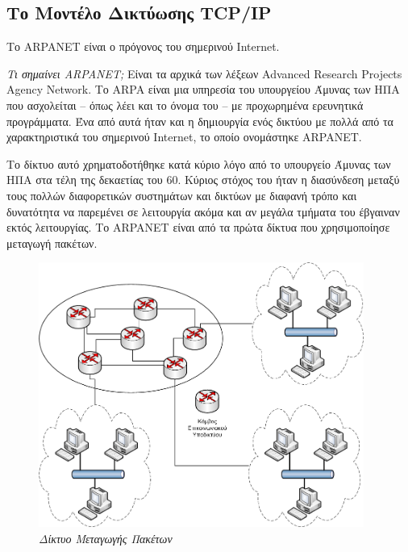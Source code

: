 %
%
\setcounter{section}{2}
\setcounter{subsection}{1}
\subsection{Το Μοντέλο Δικτύωσης TCP/IP}
Το ARPANET είναι ο πρόγονος του σημερινού Internet.

\begin{inthebox}
\emph{Τι σημαίνει ARPANET;} Είναι τα αρχικά των λέξεων Advanced Research Projects Agency Network.
Το ARPA είναι μια υπηρεσία του υπουργείου Άμυνας των ΗΠΑ που ασχολείται -- όπως λέει και το όνομα του --
με προχωρημένα ερευνητικά προγράμματα. Ένα από αυτά ήταν και η δημιουργία ενός δικτύου με πολλά από τα χαρακτηριστικά του σημερινού Internet, το οποίο ονομάστηκε ARPANET.\\
\end{inthebox}

Το δίκτυο αυτό χρηματοδοτήθηκε κατά κύριο λόγο από το υπουργείο Άμυνας των ΗΠΑ
στα τέλη της δεκαετίας του 60. Κύριος στόχος του ήταν η διασύνδεση μεταξύ τους
πολλών διαφορετικών συστημάτων και δικτύων με διαφανή τρόπο και δυνατότητα να παρεμένει
σε λειτουργία ακόμα και αν μεγάλα τμήματα του έβγαιναν εκτός λειτουργίας. Το ARPANET είναι
από τα πρώτα δίκτυα που χρησιμοποίησε μεταγωγή πακέτων.

\begin{figure}[!ht]
  \centering
  \includegraphics[width=0.95\textwidth]{images/chapter1/1-2}
  \caption {\textsl{Δίκτυο Μεταγωγής Πακέτων}}
  \label{1-2}
\end{figure}

